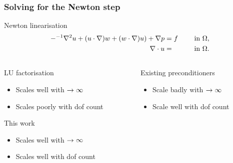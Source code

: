 \documentclass[presentation, 10pt]{beamer}
\newcommand{\cmark}{\ding{51}}
\newcommand{\xmark}{\ding{55}}
\let\Re\relax
\DeclareMathOperator{\Re}{Re}
\begin{document}
\begin{frame}[t]
  \frametitle{Solving for the Newton step}
  \begin{block}{Newton linearisation}
    \begin{alignat*}{2}
      - \Re^{-1} \nabla^2 u + (u \cdot \nabla) w + (w \cdot \nabla) u) +
      \nabla p &= f \quad && \text{ in } \Omega, \\
      \nabla \cdot u &= \quad && \text { in } \Omega.\\
    \end{alignat*}
  \end{block}
  \vspace{-2\baselineskip}
  \begin{columns}[t]
    \begin{column}{0.5\textwidth}
      \begin{block}{LU factorisation}
        \begin{itemize}
        \item[\cmark] Scales well with $\Re \to \infty$
        \item[\xmark] Scales poorly with dof count
        \end{itemize}
      \end{block}
    \begin{alertblock}{This work}
      \begin{itemize}
      \item[\cmark] Scales well with $\Re \to \infty$
      \item[\cmark] Scales well with dof count
      \end{itemize}
    \end{alertblock}
    \end{column}
    \begin{column}{0.5\textwidth}
      \begin{block}{Existing preconditioners}
        \begin{itemize}
        \item[\xmark] Scale badly with $\Re \to \infty$
        \item[\cmark] Scale well with dof count
        \end{itemize}
      \end{block}
    \end{column}
  \end{columns}
\end{frame}
\end{document}
